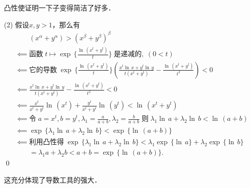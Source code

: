 \annotate 凸性使证明一下子变得简洁了好多．\bigskip

(2) \prove 假设$x,y>1$，那么有
\begin{align}
    &\mathrel{\phantom{\impliedby}} \left(x^\alpha + y^\alpha\right) > \left(x^\beta + y^\beta \right)^\beta \\
    &\impliedby \text{函数} \; t \mapsto \exp \, \{ \frac{\ln \, \left(x^t + y^t \right)}{t}\} \; \text{是递减的}, \; (0 < t) \\
    &\impliedby \text{它的导数} \; \exp \, \{ \frac{\ln \, \left(x^t+y^t\right)}{t} \}\left(\frac{x^t\ln \, x + y^t \ln \, y}{t\left(x^t+y^t\right)} - \frac{\ln \, \left(x^t + y^t\right)}{t^2}\right) < 0 \\
    &\impliedby \frac{x^t\ln \, x + y^t \ln \, y}{t\left(x^t+y^t\right)} - \frac{\ln \, \left(x^t + y^t\right)}{t^2} < 0 \\
    &\impliedby \frac{x^t}{x^t+y^t} \ln \, \left(x^t\right) + \frac{y^t}{x^t+y^t} \ln \, \left(y^t\right) < \ln \, \left(x^t+y^t\right) \\
    &\impliedby \text{令} \; a = x^t, b = y^t, \lambda_1 = \frac{a}{a+b}, \lambda_2 = \frac{b}{a+b} \; \text{则} \; \lambda_1 \ln \, a + \lambda_2 \ln \, b < \ln \, \left(a+b\right) \\
    &\impliedby \exp \, \{\lambda_1 \ln \, a + \lambda_2 \ln \, b\} < \exp \, \{\ln \, \left(a+b\right)\} \\
    &\impliedby \text{利用凸性得} \; \exp \, \{\lambda_1 \ln \, a + \lambda_2 \ln \, b\} < \lambda_1  \exp \, \{ \ln \, a \} + \lambda_2 \exp \, \{ \ln \, b \} \\
    &\mathrel{\phantom{\impliedby}} = \lambda_1 a + \lambda_2 b < a+b = \exp \, \{\ln \, \left(a+b\right)\}.
\end{align}
\qed\bigskip

\annotate 这充分体现了导数工具的强大．\bigskip

